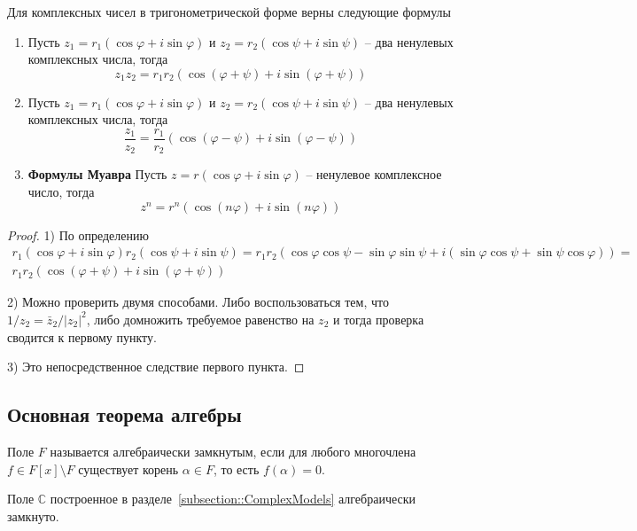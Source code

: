 \begin{claim*}
Для комплексных чисел в тригонометрической форме верны следующие формулы
\begin{enumerate}
\item Пусть $z_1 = r_1(\cos \varphi + i \sin \varphi)$ и $z_2=r_2(\cos \psi + i \sin \psi)$ -- два ненулевых комплексных числа, тогда
\[
z_1 z_2 = r_1 r_2 (\cos(\varphi + \psi) + i\sin(\varphi + \psi))
\]

\item Пусть $z_1 = r_1(\cos \varphi + i \sin \varphi)$ и $z_2=r_2(\cos \psi + i \sin \psi)$ -- два ненулевых комплексных числа, тогда
\[
\frac{z_1}{z_2} = \frac{r_1}{r_2}(\cos(\varphi - \psi) + i\sin(\varphi - \psi))
\]

\item {\bf Формулы Муавра}
Пусть $z = r(\cos \varphi + i \sin \varphi)$ -- ненулевое комплексное число, тогда
\[
z^n = r^n (\cos(n \varphi) + i \sin(n \varphi))
\]
\end{enumerate}
\end{claim*}
\begin{proof}
1) По определению
\begin{gather*}
r_1(\cos \varphi + i \sin \varphi) r_2 (\cos \psi + i \sin \psi) = r_1 r_2 (\cos \varphi \cos \psi - \sin \varphi \sin \psi + i (\sin\varphi \cos \psi + \sin \psi \cos \varphi)) =\\ r_1r_2(\cos(\varphi + \psi) + i\sin (\varphi + \psi))
\end{gather*}

2) Можно проверить двумя способами.
Либо воспользоваться тем, что $1/z_2 = \bar z_2 /|z_2|^2$, либо домножить требуемое равенство на $z_2$ и тогда проверка сводится к первому пункту.

3) Это непосредственное следствие первого пункта.
\end{proof}


\subsection{Основная теорема алгебры}

\begin{definition}
Поле $F$ называется алгебраически замкнутым, если для любого многочлена $f\in F[x]\setminus F$ существует корень $\alpha\in F$, то есть $f(\alpha) = 0$.
\end{definition}


\begin{claim}
Поле $\mathbb C$ построенное в разделе~\ref{subsection::ComplexModels} алгебраически замкнуто.
\end{claim}

